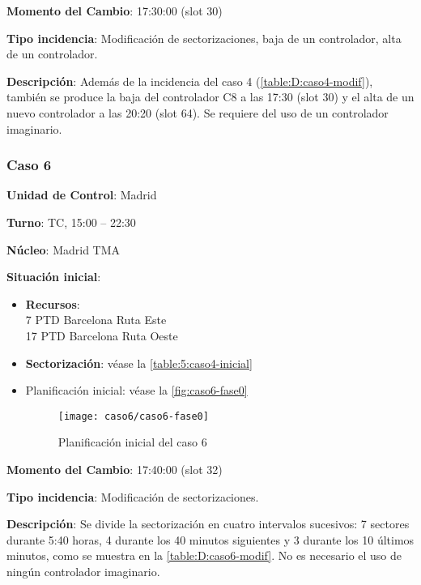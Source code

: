 \textbf{Momento del Cambio}: 17:30:00 (slot 30)

\textbf{Tipo incidencia}: Modificación de sectorizaciones, baja de un controlador, alta de un controlador.

\textbf{Descripción}: Además de la incidencia del caso 4 (\autoref{table:D:caso4-modif}), también se produce la baja del controlador C8 a las 17:30 (slot 30) y el alta de un nuevo controlador a las 20:20 (slot 64). Se requiere del uso de un controlador imaginario.

\subsubsection{Caso 6}

\textbf{Unidad de Control}: Madrid

\textbf{Turno}: TC, 15:00 -- 22:30

\textbf{Núcleo}: Madrid TMA

\textbf{Situación inicial}:
\begin{itemize}[label={}]
	
	\item \textbf{Recursos}: \\
	7 PTD Barcelona Ruta Este \\
	17 PTD Barcelona Ruta Oeste
	
	
	\item \textbf{Sectorización}: véase la \autoref{table:5:caso4-inicial}
	
	\item Planificación inicial: véase la \autoref{fig:caso6-fase0}
	
	\begin{figure}[!h]
		\centering
		\texttt{[image: caso6/caso6-fase0]}
		\caption{Planificación inicial del caso 6}
		\label{fig:caso6-fase0}
	\end{figure}
	
	
\end{itemize}

\textbf{Momento del Cambio}: 17:40:00 (slot 32)

\textbf{Tipo incidencia}: Modificación de sectorizaciones.

\textbf{Descripción}: Se divide la sectorización en cuatro intervalos sucesivos: 7 sectores durante 5:40 horas, 4 durante los 40 minutos siguientes y 3 durante los 10 últimos minutos, como se muestra en la \autoref{table:D:caso6-modif}. No es necesario el uso de ningún controlador imaginario.

